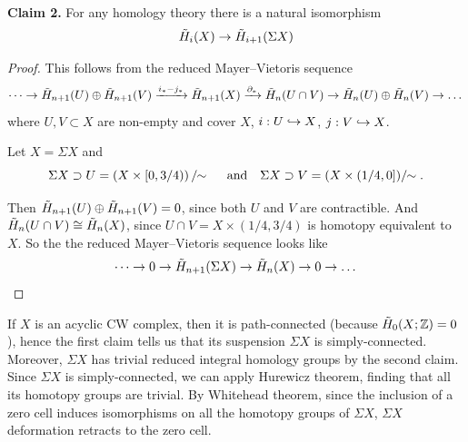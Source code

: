 \documentclass[a4paper,11pt,english]{article}
\begin{document}
\begin{exercise}[2]
\textbf{Claim 2.} For any homology theory there is a natural isomorphism
\[\tilde H_i(X)\to\tilde H_{i+1}(\Sigma X)\]

\begin{proof}
This follows from the reduced Mayer–Vietoris sequence
\[ \dots \to \tilde H_{n+1}(U) \oplus \tilde H_{n+1}(V) \xrightarrow{i_* - j_*} \tilde H_{n+1}(X) \xrightarrow{\partial_*} \tilde H_n(U \cap V) \to \tilde H_n(U) \oplus \tilde H_n(V)  \to \dots \]
where $U,V \subset X$ are non-empty and cover $X$, $i: U \hookrightarrow X$, $j: V \hookrightarrow X$.

Let $X = \Sigma X$ and 
\[\Sigma X \supset U = \left(X \times [0, 3/4) \right)/\!\!\sim\
\quad\text{and}\quad
\Sigma X \supset V= (X \times (1/4,0] )/\!\!\sim.\]
\vspace{-.5cm}
\begin{figure}[h!] 
\centering
{}
\end{figure}

Then $\tilde H_{n+1}(U) \oplus \tilde H_{n+1}(V) = 0$, since both $U$ and $V$ are contractible. And 
$\tilde H_n(U \cap V) \cong \tilde H_n(X)$, since $U \cap V = X \times (1/4,3/4)$ is homotopy equivalent to $X$. So the the reduced Mayer–Vietoris sequence looks like 
\[ \dots \to 0 \to \tilde H_{n+1}(\Sigma X) \to \tilde H_n(X) \to 0 \to \dots \]
\end{proof}

If $X$ is an acyclic CW complex, then it is path-connected (because $\tilde H_0(X;\mathbb{Z})=0$), hence the first claim tells us that its suspension $\Sigma X$ is simply-connected. Moreover, $\Sigma X$ has trivial reduced integral homology groups by the second claim. Since $\Sigma X$ is simply-connected, we can apply Hurewicz theorem, finding that all its homotopy groups are trivial. By Whitehead theorem, since the inclusion of a zero cell induces isomorphisms on all the homotopy groups of $\Sigma X$, $\Sigma X$ deformation retracts to the zero cell.
\end{exercise}

\newpage
\end{document}
